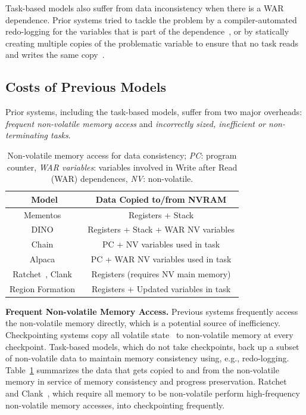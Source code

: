 Task-based models also suffer from data inconsistency when there is a WAR
dependence.  Prior systems tried to tackle the problem by a compiler-automated
redo-logging for the variables that is part of the dependence~\cite{alpaca}, or
by statically creating multiple copies of the problematic variable to ensure
that no task reads and writes the same copy~\cite{chain}.

\subsection{Costs of Previous Models}
\label{sec:cost_task-based}

Prior systems, including the task-based models, suffer from two major overheads:
{\em frequent non-volatile memory access} and {\em incorrectly sized, inefficient or non-terminating tasks}.

\begin{table}
    \centering
    \footnotesize
    \begin{tabular}{|c|c|}
        \hline
        Model & Data Copied to/from NVRAM \\
        \hline\hline
        Mementos~\cite{mementos}	& Registers + Stack     \\
        DINO~\cite{dino}	& Registers + Stack + WAR NV variables \\%
        Chain~\cite{chain}	& PC + NV variables used in task\\
        Alpaca~\cite{alpaca}	& PC + WAR NV variables used in task\\
        Ratchet~\cite{ratchet}, Clank~\cite{hicks_isca_2017} & Registers (requires NV main memory) \\
        Region Formation~\cite{baghsorkhi_cgo_2018} & Registers + Updated variables in task \\
        \hline
    \end{tabular}
    \caption{Non-volatile memory access for data consistency; \emph{PC}: program counter, \emph{WAR variables}: variables involved in Write after Read (WAR) dependences, \emph{NV}: non-volatile.}
    \label{table:chechpoint_comparison}
\end{table}


\textbf{Frequent Non-volatile Memory Access.} 
Previous systems frequently access the non-volatile memory directly, which is a potential source of inefficiency.  Checkpointing systems copy all volatile
state~\cite{dino, mementos, ratchet, hicks_isca_2017} to non-volatile memory at
every checkpoint.  Task-based models, which do not take checkpoints, back up a
subset of non-volatile data to maintain memory consistency using, e.g.,
redo-logging.  Table~\ref{table:chechpoint_comparison} summarizes the data that
gets copied to and from the non-volatile memory in service of memory
consistency and progress preservation.  Ratchet~\cite{ratchet} and
Clank~\cite{hicks_isca_2017}, which require all memory to be non-volatile
perform high-frequency non-volatile memory accesses, into checkpointing
frequently.

